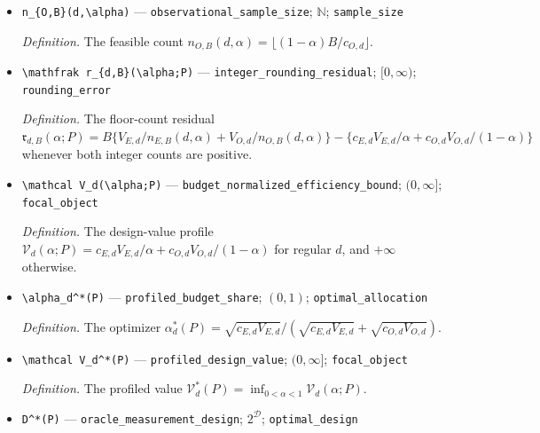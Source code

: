 \documentclass{article}
\begin{document}
\begin{itemize}
  \item \texttt{n\_\allowbreak{}\{O,\allowbreak{}B\}\allowbreak{}(d,\allowbreak{}\textbackslash{}\allowbreak{}alpha)} --- \texttt{observational\_\allowbreak{}sample\_\allowbreak{}size}; \(\mathbb N\); \texttt{sample\_\allowbreak{}size}
  \par\smallskip\noindent\emph{Definition.} The feasible count \(n_{O,B}(d,\alpha)=\lfloor(1-\alpha)B/c_{O,d}\rfloor\).
  \item \texttt{\textbackslash{}\allowbreak{}mathfrak r\_\allowbreak{}\{d,\allowbreak{}B\}\allowbreak{}(\textbackslash{}\allowbreak{}alpha;\allowbreak{}P)} --- \texttt{integer\_\allowbreak{}rounding\_\allowbreak{}residual}; \([0,\infty)\); \texttt{rounding\_\allowbreak{}error}
  \par\smallskip\noindent\emph{Definition.} The floor-count residual \(\mathfrak r_{d,B}(\alpha;P)=B\{V_{E,d}/n_{E,B}(d,\alpha)+V_{O,d}/n_{O,B}(d,\alpha)\}-\{c_{E,d}V_{E,d}/\alpha+c_{O,d}V_{O,d}/(1-\alpha)\}\) whenever both integer counts are positive.
  \item \texttt{\textbackslash{}\allowbreak{}mathcal V\_\allowbreak{}d(\textbackslash{}\allowbreak{}alpha;\allowbreak{}P)} --- \texttt{budget\_\allowbreak{}normalized\_\allowbreak{}efficiency\_\allowbreak{}bound}; \((0,\infty]\); \texttt{focal\_\allowbreak{}object}
  \par\smallskip\noindent\emph{Definition.} The design-value profile \(\mathcal V_d(\alpha;P)=c_{E,d}V_{E,d}/\alpha+c_{O,d}V_{O,d}/(1-\alpha)\) for regular \(d\), and \(+\infty\) otherwise.
  \item \texttt{\textbackslash{}\allowbreak{}alpha\_\allowbreak{}d\textasciicircum{}*(P)} --- \texttt{profiled\_\allowbreak{}budget\_\allowbreak{}share}; \((0,1)\); \texttt{optimal\_\allowbreak{}allocation}
  \par\smallskip\noindent\emph{Definition.} The optimizer \(\alpha_d^*(P)=\sqrt{c_{E,d}V_{E,d}}/(\sqrt{c_{E,d}V_{E,d}}+\sqrt{c_{O,d}V_{O,d}})\).
  \item \texttt{\textbackslash{}\allowbreak{}mathcal V\_\allowbreak{}d\textasciicircum{}*(P)} --- \texttt{profiled\_\allowbreak{}design\_\allowbreak{}value}; \((0,\infty]\); \texttt{focal\_\allowbreak{}object}
  \par\smallskip\noindent\emph{Definition.} The profiled value \(\mathcal V_d^*(P)=\inf_{0<\alpha<1}\mathcal V_d(\alpha;P)\).
  \item \texttt{D\textasciicircum{}*(P)} --- \texttt{oracle\_\allowbreak{}measurement\_\allowbreak{}design}; \(2^{\mathcal D}\); \texttt{optimal\_\allowbreak{}design}

\end{itemize}
\end{document}
